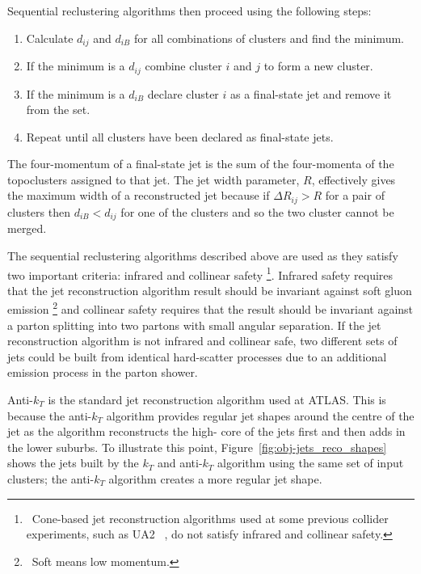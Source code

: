 \noindent Sequential reclustering algorithms then proceed using the following steps:
\vspace{-0.5em}
\begin{enumerate}[nolistsep,leftmargin=*]
  \item Calculate $d_{ij}$ and $d_{iB}$ for all combinations of clusters and find the minimum.
  \item If the minimum is a $d_{ij}$ combine cluster $i$ and $j$ to form a new cluster. 
  \item If the minimum is a $d_{iB}$ declare cluster $i$ as a final-state jet and remove it from the set.  
  \item Repeat until all clusters have been declared as final-state jets. 
\end{enumerate} 

The four-momentum of a final-state jet is the sum of the four-momenta of the topoclusters assigned to that jet.
The jet width parameter, $R$, effectively gives the maximum width of a reconstructed jet
because if $\Delta R_{ij} > R$  for a pair of clusters then
$d_{iB} < d_{ij}$ for one of the clusters %
and so the two cluster cannot be merged.

The sequential reclustering algorithms described above are used as they satisfy two important %
criteria: infrared and collinear safety \footnote{\ Cone-based jet reconstruction algorithms used at some previous collider experiments,
  such as UA2 ~\cite{obj-jets_reco_UA2}, do not satisfy infrared and collinear safety.}.
Infrared safety requires that the jet reconstruction algorithm result should be invariant against soft gluon emission \footnote{\ Soft means low momentum.}
and collinear safety requires that the result should be invariant against a parton splitting into two partons with small angular separation.
If the jet reconstruction algorithm is not infrared and collinear safe,
two different sets of jets could be built from identical hard-scatter processes
due to an additional emission process in the parton shower.

Anti-$k_T$ is the standard jet reconstruction algorithm used at ATLAS. %
This is because the anti-$k_T$ algorithm provides regular jet shapes around the centre of the jet as
the algorithm reconstructs the high-\pT{} core of the jets first and then adds in the lower \pT{} suburbs. %
To illustrate this point, Figure~\ref{fig:obj-jets_reco_shapes} shows the jets built by the %
$k_T$ and anti-$k_T$ algorithm using the same set of input clusters; the anti-$k_T$ algorithm creates a more regular jet shape.

